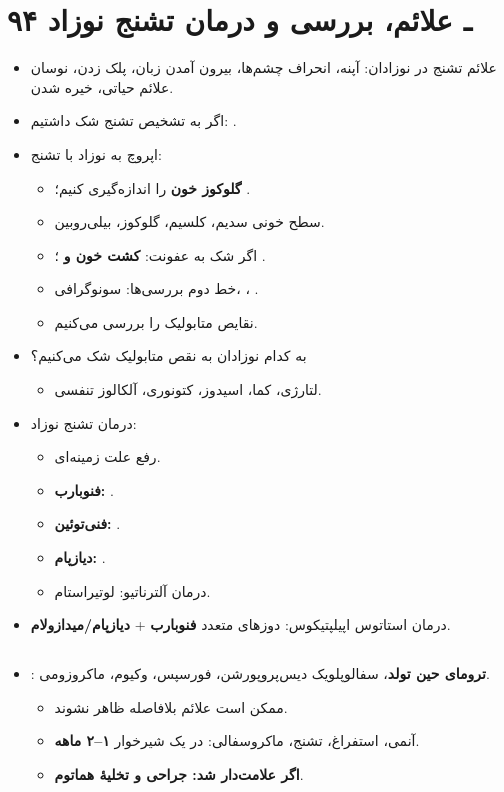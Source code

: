 \documentclass[12pt,a4paper]{article}
\begin{document}
\clearpage
\section*{۹۴ ـ علائم، بررسی و درمان تشنج نوزاد}
\begin{itemize}
\item علائم تشنج در نوزادان: آپنه، انحراف چشم‌ها، بیرون آمدن زبان، پلک زدن، نوسان علائم حیاتی، خیره شدن.
\item اگر به تشخیص تشنج شک داشتیم: .
\item اپروچ به نوزاد با تشنج:
  \begin{itemize}
  \item \textbf{گلوکوز خون} را اندازه‌گیری کنیم؛ .
  \item سطح خونی سدیم، کلسیم، گلوکوز، بیلی‌روبین.
  \item اگر شک به عفونت: \textbf{کشت خون و }؛ \textbf{}.
  \item خط دوم بررسی‌ها: سونوگرافی، ، .
  \item نقایص متابولیک را بررسی می‌کنیم.
  \end{itemize}
\item به کدام نوزادان به نقص متابولیک شک می‌کنیم؟
  \begin{itemize}
  \item لتارژی، کما، اسیدوز، کتونوری، آلکالوز تنفسی.
  \end{itemize}
\item درمان تشنج نوزاد:
  \begin{itemize}
  \item رفع علت زمینه‌ای.
  \item \textbf{فنوبارب: }.
  \item \textbf{فنی‌توئین: }.
  \item \textbf{دیازپام: }.
  \item درمان آلترناتیو: لوتیراستام.
  \end{itemize}
\item درمان استاتوس اپیلپتیکوس: دوزهای متعدد \textbf{فنوبارب} + \textbf{دیازپام/میدازولام}.
\end{itemize}
\subsection*{}
\begin{itemize}
\item {}: \textbf{ترومای حین تولد}، سفالوپلویک دیس‌پروپورشن، فورسپس، وکیوم، ماکروزومی.
  \begin{itemize}
  \item ممکن است علائم بلافاصله ظاهر نشوند.
  \item آنمی، استفراغ، تشنج، ماکروسفالی: در یک شیرخوار \textbf{۱–۲ ماهه}.
  \item \textbf{اگر علامت‌دار شد: جراحی و تخلیهٔ هماتوم}.
  \end{itemize}
\end{itemize}
\end{document}
